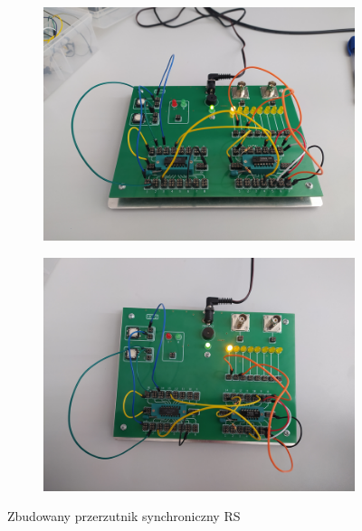 \begin{itemize}
\begin{figure}[H]
\begin{subfigure}[H]{0.45\textwidth}
                \includegraphics[width=\textwidth]{img/synch_RS/1653500525466_scaled.png}
            \end{subfigure}
            \begin{subfigure}[H]{0.45\textwidth}
                \includegraphics[width=\textwidth]{img/synch_RS/1653500525452_scaled.png}
            \end{subfigure}
            \caption{Zbudowany przerzutnik synchroniczny RS}
        \end{figure}
    

\end{itemize}
